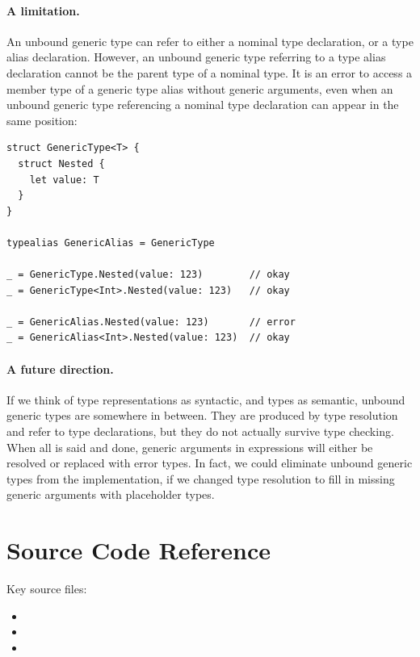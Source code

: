 \documentclass[../generics]{subfiles}
\begin{document}
\paragraph{A limitation.} An unbound generic type can refer to either a nominal type declaration, or a type alias declaration. However, an unbound generic type referring to a type alias declaration cannot be the parent type of a nominal type. It is an error to access a member type of a generic type alias without generic arguments, even when an unbound generic type referencing a nominal type declaration can appear in the same position:
\begin{Verbatim}
struct GenericType<T> {
  struct Nested {
    let value: T
  }
}

typealias GenericAlias = GenericType

_ = GenericType.Nested(value: 123)        // okay
_ = GenericType<Int>.Nested(value: 123)   // okay

_ = GenericAlias.Nested(value: 123)       // error
_ = GenericAlias<Int>.Nested(value: 123)  // okay
\end{Verbatim}

\paragraph{A future direction.} If we think of type representations as syntactic, and types as semantic, unbound generic types are somewhere in between. They are produced by type resolution and refer to type declarations, but they do not actually survive type checking. When all is said and done, generic arguments in expressions will either be resolved or replaced with error types. In fact, we could eliminate unbound generic types from the implementation, if we changed type resolution to fill in missing generic arguments with placeholder types.

\section{Source Code Reference}\label{src:type resolution}

Key source files:
\begin{itemize}
\item {}
\item {}
\item {}
\end{itemize}
\end{document}
